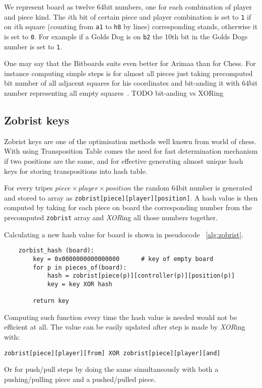 	We represent board as twelve 64bit numbers, one for each combination of
	player and piece kind. The $i$th bit of certain piece and player
	combination is set to \texttt{1} if on $i$th square (counting from
	\texttt{a1} to \texttt{h8} by lines) corresponding stands, otherwise it
	is set to \texttt{0}. For example if a Golds Dog is on \texttt{b2} the 10th
	bit in the Golds Dogs number is set to \texttt{1}.

	One may say that the Bitboards suits even better for Arimaa than for Chess.
	For instance computing simple steps is for almost all pieces just taking
	precomputed bit number of all adjacent squares for his coordinates and
	bit-anding it with 64bit number representing all empty
	squares~\cite{BitboardAnalysis}. TODO bit-anding vs XORing

	\subsection{Zobrist keys}
	Zobrist keys are one of the optimisation methods well known from world of
	chess. With using Transposition Table comes the need for fast determination
	mechanism if two positions are the same, and for effective generating
	almost unique hash keys for storing transpositions into hash table.
	
	For every tripes $piece\times player\times position$ the random 64bit
	number is generated and stored to array as
	\texttt{zobrist[piece][player][position]}. A hash value is then computed by
	taking for each piece on board the corresponding number from the
	precomputed \texttt{zobrist} array and \emph{XOR}ing all those numbers
	together.

	Calculating a new hash value for board is shown in pseudocode
	~\ref{alg:zobrist}.

	\lstset{language=Python, caption=Computing hash value from zobrist keys, label=alg:zobrist}
	\begin{lstlisting}
    zorbist_hash (board):
        key = 0x0000000000000000      # key of empty board
        for p in pieces_of(board):
            hash = zobrist[piece(p)][controller(p)][position(p)]
            key = key XOR hash

        return key
    \end{lstlisting}

	Computing such function every time the hash value is needed would not be
	efficient at all. The value can be easily updated after step is made by
	\emph{XOR}ing with:
	\begin{center}
		\texttt{zobrist[piece][player][from] XOR zobrist[piece][player][and]}
	\end{center}
	Or for push/pull steps by doing the same simultaneously with both a
	pushing/pulling piece and a pushed/pulled piece.

